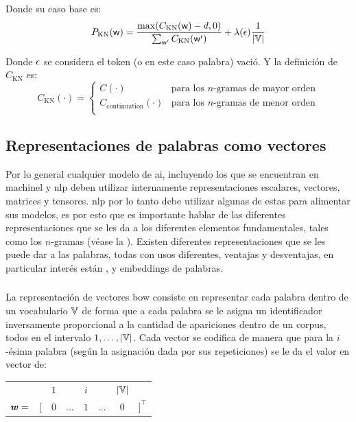 Donde su caso base es:
\begin{equation}
  P_{\mathrm{KN}}({\mathit{\mathsf{w}}}) = \frac{ \max(C_{\mathrm{KN}}({\mathit{\mathsf{w}}}) -d, 0) }{\sum_{{\mathit{\mathsf{w}}}^{\prime}} C_{\mathrm{KN}}({\mathit{\mathsf{w}}}^{\prime})} + \lambda({\epsilon}) \frac{1}{|{\mathbb{V}}|}
\end{equation}

Donde ${\epsilon}$ se considera el token (o en este caso palabra) vació. Y la definición de $C_{\mathrm{KN}}$ es:
\begin{equation}
  C_{\mathrm{KN}}(\cdot) = \left\{ \begin{array}{ll}
            C(\cdot) & \text{para los $n$-gramas de mayor orden} \\
            C_{\mathrm{continuation}}(\cdot) & \text{para los $n$-gramas de menor orden} \\
          \end{array} \right.
\end{equation}


\subsection{Representaciones de palabras como vectores} \label{ch:word-representations}
Por lo general cualquier modelo de \gls{ai}, incluyendo los que se encuentran en \gls{machinel} y \gls{nlp} deben utilizar internamente representaciones escalares, vectores, matrices y tensores. \gls{nlp} por lo tanto debe utilizar algunas de estas para alimentar sus modelos, es por esto que es importante hablar de las diferentes representaciones que se les da a los diferentes elementos fundamentales, tales como los $n$-gramas (véase la ). Existen diferentes representaciones que se les puede dar a las palabras, todas con usos diferentes, ventajas y desventajas, en particular interés están ,  y embeddings de palabras.

\subsubsection{}
La representación de vectores \gls{bow} consiste en representar cada palabra dentro de un vocabulario ${\mathbb{V}}$ de forma que a cada palabra se le asigna un identificador inversamente proporcional a la cantidad de apariciones dentro de un \gls{corpus}, todos en el intervalo $1, \ldots, |{\mathbb{V}}|$. Cada vector se codifica de manera que para la $i$-ésima palabra (según la asignación dada por sus repeticiones) se le da el valor en vector de:
\begin{center}
\begin{tabular}{cccccccc}
           &     & $1$ &           & $i$   &          & $|{\mathbb{V}}|$ &  \\
  ${\bm{w}} = $ & $[$ & $0$ & $\ldots$  & $1$ & $\ldots$    & $0$ & $]^{\top}$
\end{tabular}
\end{center}

